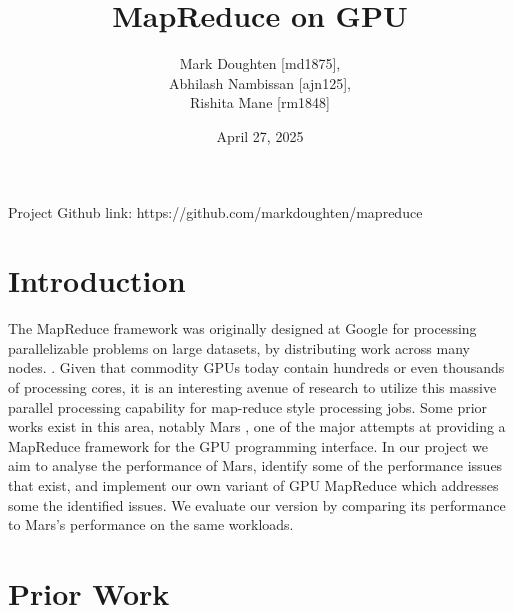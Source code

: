 \documentclass{article}
\title{MapReduce on GPU}
\author{Mark Doughten [md1875], \\ Abhilash Nambissan [ajn125], \\ Rishita Mane [rm1848]}
\date{April 27, 2025}
\begin{document}
\maketitle

Project Github link: https://github.com/markdoughten/mapreduce


\section{Introduction}
The MapReduce framework was originally designed at Google for processing  parallelizable problems on large datasets, by distributing work across many nodes. \cite{mapreduce}. Given that commodity GPUs today contain hundreds or even thousands of processing cores, it is an interesting avenue of research to utilize this massive parallel processing capability for map-reduce style processing jobs. Some prior works exist in this area, notably Mars \cite{mars}, one of the major attempts at providing a MapReduce framework for the GPU programming interface. In our project we aim to analyse the performance of Mars, identify some of the performance issues that exist, and implement our own variant of GPU MapReduce which addresses some the identified issues. We evaluate our version by comparing its performance to Mars's performance on the same workloads. 

\section{Prior Work}
\end{document}

